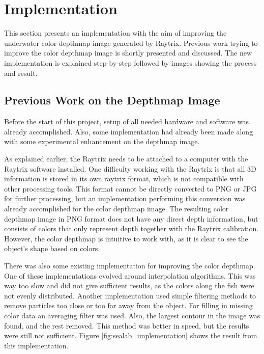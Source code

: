 \section{Implementation}\label{implementation}

This section presents an implementation with the aim of improving the underwater color depthmap image generated by Raytrix. Previous work trying to improve the color depthmap image is shortly presented and discussed. The new implementation is explained step-by-step followed by images showing the process and result.


\subsection{Previous Work on the Depthmap Image}

Before the start of this project, setup of all needed hardware and software was already accomplished. Also, some implementation had already been made along with some experimental enhancement on the depthmap image.

As explained earlier, the Raytrix needs to be attached to a computer with the Raytrix software installed. One difficulty working with the Raytrix is that all 3D information is stored in its own raytrix format, which is not compatible with other processing tools. This format cannot be directly converted to PNG or JPG for further processing, but an implementation performing this conversion was already accomplished for the color depthmap image. The resulting color depthmap image in PNG format does not have any direct depth information, but consists of colors that only represent depth together with the Raytrix calibration.
However, the color depthmap is intuitive to work with, as it is clear to see the object's shape based on colors.

There was also some existing implementation for improving the color depthmap. One of these implementations evolved around interpolation algorithms. This was way too slow and did not give sufficient results, as the colors along the fish were not evenly distributed.  
Another implementation used simple filtering methods to remove particles too close or too far away from the object. For filling in missing color data an averaging filter was used. Also, the largest contour in the image was found, and the rest removed. This method was better in speed, but the results were still not sufficient. Figure \ref{fig:sealab_implementation} shows the result from this implementation.


